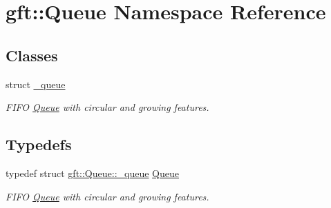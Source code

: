 \hypertarget{namespacegft_1_1Queue}{\section{gft\-:\-:Queue Namespace Reference}
\label{namespacegft_1_1Queue}
}
\subsection*{Classes}
\begin{DoxyCompactItemize}
\item 
struct \hyperlink{structgft_1_1Queue_1_1__queue}{\-\_\-queue}
\begin{DoxyCompactList}\small\item\em F\-I\-F\-O \hyperlink{namespacegft_1_1Queue}{Queue} with circular and growing features. \end{DoxyCompactList}\end{DoxyCompactItemize}
\subsection*{Typedefs}
\begin{DoxyCompactItemize}
\item 
typedef struct \hyperlink{structgft_1_1Queue_1_1__queue}{gft\-::\-Queue\-::\-\_\-queue} \hyperlink{namespacegft_1_1Queue_a40c8ceeef88d837f796d9e5e09ba8b44}{Queue}
\begin{DoxyCompactList}\small\item\em F\-I\-F\-O \hyperlink{namespacegft_1_1Queue}{Queue} with circular and growing features. \end{DoxyCompactList}\end{DoxyCompactItemize}
